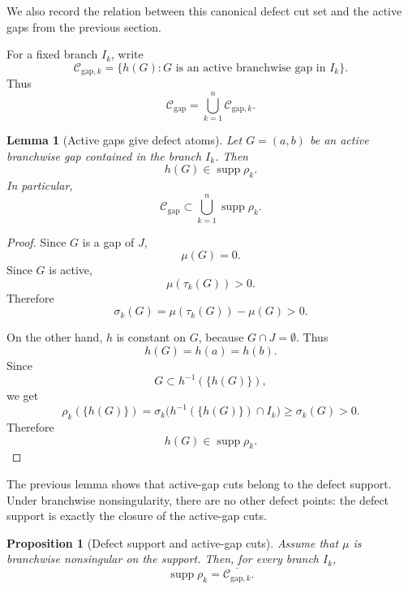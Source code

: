 \documentclass[11pt]{amsart}
\theoremstyle{plain}
\newtheorem{lemma}[theorem]{Lemma}
\newtheorem{proposition}[theorem]{Proposition}
\theoremstyle{definition}
\theoremstyle{remark}
\DeclareMathOperator{\supp}{supp}
\newcommand{\cC}{\mathcal C}
\begin{document}
We also record the relation between this canonical defect cut set and the active gaps from
the previous section.

For a fixed branch \(I_k\), write
\[
        \cC_{\mathrm{gap},k}
        =
        \{h(G):G \text{ is an active branchwise gap in } I_k\}.
\]
Thus
\[
        \cC_{\mathrm{gap}}=\bigcup_{k=1}^n \cC_{\mathrm{gap},k}.
\]

\begin{lemma}[Active gaps give defect atoms]\label{lem:active-gaps-defect-atoms}
Let \(G=(a,b)\) be an active branchwise gap contained in the branch \(I_k\). Then
\[
        h(G)\in \supp\rho_k.
\]
In particular,
\[
        \cC_{\mathrm{gap}}
        \subset
        \bigcup_{k=1}^n \supp \rho_k.
\]
\end{lemma}

\begin{proof}
Since \(G\) is a gap of \(J\),
\[
        \mu(G)=0.
\]
Since \(G\) is active,
\[
        \mu(\tau_k(G))>0.
\]
Therefore
\[
        \sigma_k(G)=\mu(\tau_k(G))-\mu(G)>0.
\]

On the other hand, \(h\) is constant on \(G\), because \(G\cap J=\emptyset\). Thus
\[
        h(G)=h(a)=h(b).
\]
Since
\[
        G\subset h^{-1}(\{h(G)\}),
\]
we get
\[
\rho_k(\{h(G)\})
=
\sigma_k\bigl(h^{-1}(\{h(G)\})\cap I_k\bigr)
\ge
\sigma_k(G)
>
0.
\]
Therefore
\[
        h(G)\in \supp\rho_k.
\]
\end{proof}

The previous lemma shows that active-gap cuts belong to the defect support. Under
branchwise nonsingularity, there are no other defect points: the defect support is exactly
the closure of the active-gap cuts.

\begin{proposition}[Defect support and active-gap cuts]\label{prop:defect-support-active-closure}
Assume that \(\mu\) is branchwise nonsingular on the support. Then, for every branch
\(I_k\),
\[
        \supp\rho_k=\overline{\cC_{\mathrm{gap},k}}.
\]
\end{proposition}
\end{document}

